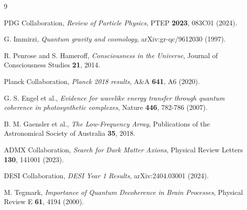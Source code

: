 \documentclass[12pt,a4paper]{article}
\begin{document}
\begin{thebibliography}{9}

 PDG Collaboration, \textit{Review of Particle Physics},
PTEP \textbf{2023}, 083C01 (2024).

 G. Immirzi, \textit{Quantum gravity and
cosmology}, arXiv:gr-qc/9612030 (1997).

 R. Penrose and S. Hameroff, \textit{Consciousness
in the Universe}, Journal of Consciousness Studies \textbf{21}, 2014.

 Planck Collaboration, \textit{Planck 2018 results},
A\&A \textbf{641}, A6 (2020).

 G. S. Engel et al., \textit{Evidence for wavelike
energy transfer through quantum coherence in photosynthetic complexes},
Nature \textbf{446}, 782-786 (2007).

 B. M. Gaensler et al., \textit{The Low-Frequency
Array}, Publications of the Astronomical Society of Australia \textbf{35}, 2018.

 ADMX Collaboration, \textit{Search for Dark Matter
Axions}, Physical Review Letters \textbf{130}, 141001 (2023).

 DESI Collaboration, \textit{DESI Year 1 Results},
arXiv:2404.03001 (2024).

 M. Tegmark, \textit{Importance of Quantum
Decoherence in Brain Processes}, Physical Review E \textbf{61}, 4194 (2000).

\end{thebibliography}
\end{document}
